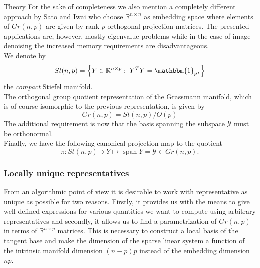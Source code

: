 \begin{chapter}{Theory}
For the sake of completeness we also mention a completely different approach by Sato and Iwai \cite{Sato2014} who choose $\mathbb{R}^{n\times n}$ as embedding space
where elements of $Gr(n,p)$ are given by rank $p$ orthogonal projection matrices. The presented applications are, however, mostly eigenvalue problems while in the case
of image denoising the increased memory requirements are disadvantageous.\\

We denote by 
\begin{equation}
St(n,p)=\left\lbrace Y\in\mathbb{R}^{n\times p}:\; Y^TY=\mathbbm{1}_p,\right\rbrace
\end{equation}
the \emph{compact} Stiefel manifold.\\

The orthogonal group quotient representation of the Grassmann manifold, which is of course isomorphic to the previous representation, is given by
\begin{equation}
    Gr(n,p) = St(n,p) / O(p) %
\end{equation}
The additional requirement is now that the basis spanning the subspace $\mathcal{Y}$ must be orthonormal. \\

Finally, we have the following canonical projection map to the quotient
\begin{equation}
    \pi : St(n,p)\ni Y \mapsto \operatorname{span} Y=\mathcal{Y} \in Gr(n, p).
\end{equation}

\subsubsection{Locally unique representatives} %
\label{ssub:Locally unique Representative}
From an algorithmic point of view it is desirable to work with representative as unique as possible for two reasons.
Firstly, it provides us with the means to give well-defined expressions for various quantities we want to compute using arbitrary representatives and secondly, it allows us to find a parametrization of $Gr(n,p)$ in terms of $\mathbb{R}^{n\times p}$ matrices.
This is necessary to construct a local basis of the tangent base and make the dimension of the sparse linear system a function of the intrinsic manifold dimension $(n-p)p$ instead of the embedding dimension $np$.\\


\end{chapter}
